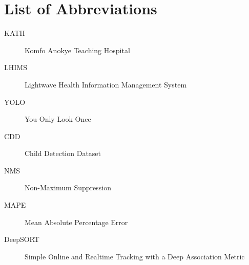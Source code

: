 \chapter*{List of Abbreviations}
\begin{description}
    \item[KATH] Komfo Anokye Teaching Hospital
    \item[LHIMS] Lightwave Health Information Management System
    \item[YOLO] You Only Look Once
    \item[CDD] Child Detection Dataset
    \item[NMS] Non-Maximum Suppression
    \item[MAPE] Mean Absolute Percentage Error
    \item[DeepSORT] Simple Online and Realtime Tracking with a Deep Association Metric
\end{description}
